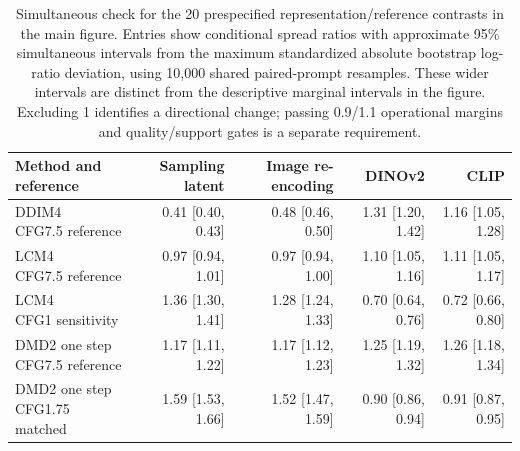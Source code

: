\begin{table}[t]
\centering\footnotesize
\setlength{\tabcolsep}{5pt}
\begin{tabular}{lrrrr}
\toprule
Method and reference & Sampling latent & Image re-encoding & DINOv2 & CLIP \\
\midrule
\shortstack[l]{DDIM4\\CFG7.5 reference} & 0.41 [0.40, 0.43] & 0.48 [0.46, 0.50] & 1.31 [1.20, 1.42] & 1.16 [1.05, 1.28] \\[2pt]
\shortstack[l]{LCM4\\CFG7.5 reference} & 0.97 [0.94, 1.01] & 0.97 [0.94, 1.00] & 1.10 [1.05, 1.16] & 1.11 [1.05, 1.17] \\[2pt]
\shortstack[l]{LCM4\\CFG1 sensitivity} & 1.36 [1.30, 1.41] & 1.28 [1.24, 1.33] & 0.70 [0.64, 0.76] & 0.72 [0.66, 0.80] \\[2pt]
\shortstack[l]{DMD2 one step\\CFG7.5 reference} & 1.17 [1.11, 1.22] & 1.17 [1.12, 1.23] & 1.25 [1.19, 1.32] & 1.26 [1.18, 1.34] \\[2pt]
\shortstack[l]{DMD2 one step\\CFG1.75 matched} & 1.59 [1.53, 1.66] & 1.52 [1.47, 1.59] & 0.90 [0.86, 0.94] & 0.91 [0.87, 0.95] \\[2pt]
\bottomrule
\end{tabular}
\caption{Simultaneous check for the 20 prespecified representation/reference contrasts in the main figure. Entries show conditional spread ratios with approximate 95\% simultaneous intervals from the maximum standardized absolute bootstrap log-ratio deviation, using 10,000 shared paired-prompt resamples. These wider intervals are distinct from the descriptive marginal intervals in the figure. Excluding 1 identifies a directional change; passing 0.9/1.1 operational margins and quality/support gates is a separate requirement.}
\label{tab:t2i_simultaneous}
\end{table}

